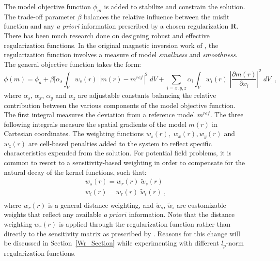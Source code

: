 The model objective function $\phi_m$ is added to stabilize and constrain the solution.
The trade-off parameter $\beta$ balances the relative influence between the misfit function and any \emph{a priori} information prescribed by a chosen regularization $\mathbf{R}$.
There has been much research done on designing robust and effective regularization functions.
In the original magnetic inversion work of \cite{LiOldenburg1996}, the regularization function involves a measure of model \emph{smallness} and \emph{smoothness}.
The general objective function takes the form:
\begin{equation} \label{eq:Phi_int}
\phi(m) =  \phi_d + \beta \Big [ \alpha_s\int_V w_s(r) \; {\left|m(r) - m^{ref}\right|^2} \; dV + 
\sum_{i = x,y,z} \alpha_i \int_V w_i(r)\; {\left|\frac{\partial m(r)}{\partial x_i}\right|^2} \;dV \Big ]\;,
\end{equation}
where $\alpha_s$, $\alpha_x$, $\alpha_y$ and $\alpha_z$ are adjustable constants balancing the relative contribution between the various components of the model objective function.
The first integral measures the deviation from a reference model $m^{ref}$. The three following integrals measure the spatial gradients of the model $m(r)$ in Cartesian coordinates. 
The weighting functions ${w_s(r)},\;{w_x(r)}, {w_y(r)}$ and ${w_z(r)}$ are cell-based penalties added to the system to reflect specific characteristics expended from the solution.
For potential field problems, it is common to resort to a sensitivity-based weighting in order to compensate for the natural decay of the kernel functions, such that:
\begin{equation}\label{Cell-weight}
\begin{split}
w_s(r) = w_r(r) \; \tilde w_s(r) \\
w_i(r) = w_r(r) \; \tilde w_i(r) \;,\\
\end{split}
\end{equation}
where $w_r(r)$ is a general distance weighting, and $\tilde w_s$, $\tilde w_i$ are customizable weights that reflect any available $a \; priori$ information.
Note that the distance weighting $w_r(r)$ is applied through the regularization function rather than directly to the sensitivity matrix as prescribed by \cite{LiOldenburg1996}. 
Reasons for this change will be discussed in Section~\ref{Wr_Section} while experimenting with different $l_p$-norm regularization functions. 

